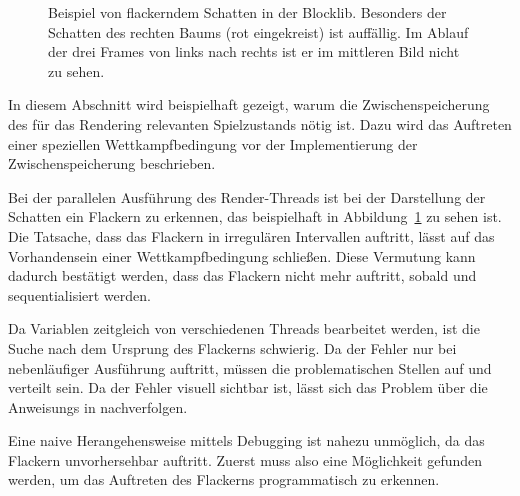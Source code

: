 \begin{figure}
	\hfill
	\hfill
	\caption[Beispiel von flackerndem Schatten in der Blocklib.]{Beispiel von flackerndem Schatten in der Blocklib. Besonders der Schatten des rechten Baums (rot eingekreist) ist auffällig. Im Ablauf der drei Frames von links nach rechts ist er im mittleren Bild nicht zu sehen.}\label{fig:flackern}
\end{figure}
In diesem Abschnitt wird beispielhaft gezeigt, warum die Zwischenspeicherung des für das Rendering relevanten Spielzustands nötig ist. Dazu wird das Auftreten einer speziellen Wettkampfbedingung vor der Implementierung der Zwischenspeicherung beschrieben. 

Bei der parallelen Ausführung des Render-Threads ist bei der Darstellung der Schatten ein Flackern zu erkennen, das beispielhaft in Abbildung~\ref{fig:flackern} zu sehen ist. Die Tatsache, dass das Flackern in irregulären Intervallen auftritt, lässt auf das Vorhandensein einer Wettkampfbedingung schließen. Diese Vermutung kann dadurch bestätigt werden, dass das Flackern nicht mehr auftritt, sobald  und  sequentialisiert werden.

Da Variablen zeitgleich von verschiedenen Threads bearbeitet werden, ist die Suche nach dem Ursprung des Flackerns schwierig. Da der Fehler nur bei nebenläufiger Ausführung auftritt, müssen die problematischen Stellen auf  und  verteilt sein. Da der Fehler visuell sichtbar ist, lässt sich das Problem über die \glspl{Anweisung} in  nachverfolgen. 

Eine naive Herangehensweise mittels Debugging ist nahezu unmöglich, da das Flackern unvorhersehbar auftritt. Zuerst muss also eine Möglichkeit gefunden werden, um das Auftreten des Flackerns programmatisch zu erkennen.

